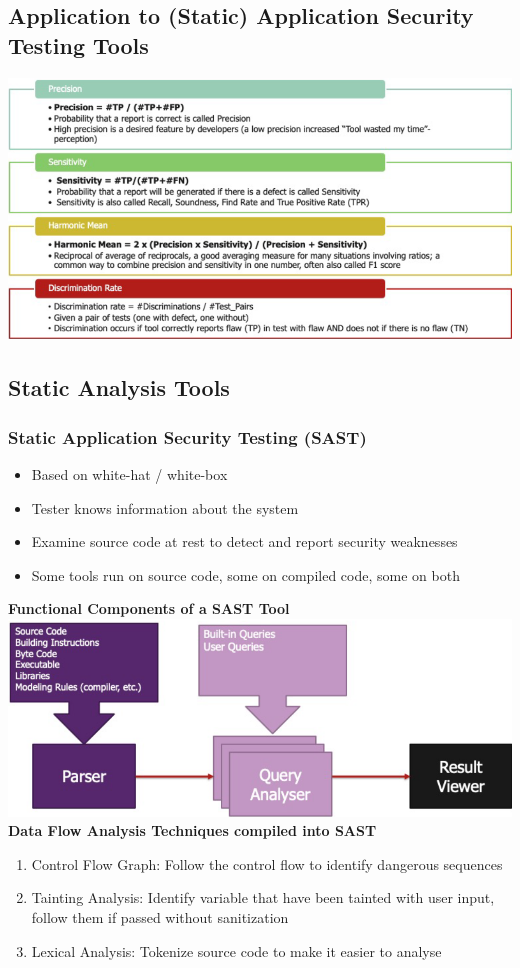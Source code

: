 \subsection{Application to (Static) Application Security Testing Tools}
\includegraphics[width=\linewidth]{../img/application.png}

\columnbreak
\subsection{Static Analysis Tools}
\subsubsection{Static Application Security Testing (SAST)}
\begin{itemize}
    \item Based on white-hat / white-box
    \item Tester knows information about the system
    \item Examine source code at rest to detect and report security weaknesses
    \item Some tools run on source code, some on compiled code, some on both
\end{itemize}
\textbf{Functional Components of a SAST Tool}\\
\includegraphics[width=\linewidth]{../img/sast_tool.png}\\
\textbf{Data Flow Analysis Techniques compiled into SAST}
\begin{enumerate}
    \item Control Flow Graph: Follow the control flow to identify dangerous sequences
    \item Tainting Analysis: Identify variable that have been tainted with user input, follow them if passed without sanitization
    \item Lexical Analysis: Tokenize source code to make it easier to analyse
\end{enumerate}

